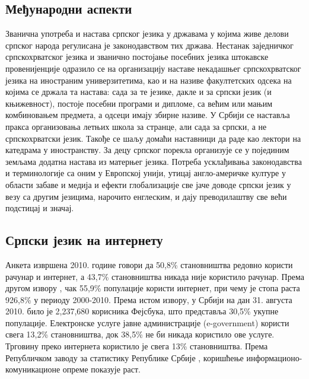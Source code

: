 {\begin{multicols}{2}
 \subsection {Међународни аспекти}
   
 
Званична употреба и настава српског језика у државама у којима живе делови српског народа регулисана је законодавством тих држава. 
Нестанак заједничког српскохрватског језика и званично постојање посебних језика штокавске провенијенције одразило се на организацију наставе некадашњег српскохрватског језика на иностраним универзитетима, као и на називе факултетских одсека на којима се држала та настава: сада за те језике, дакле и за српски језик (и књижевност), постоје посебни програми и дипломе, са већим или мањим комбиновањем предмета, а одсеци имају збирне називе.
У Србији се наставља пракса организовања летњих  школа за странце, али сада за српски, а не српскохрватски језик. Такође се шаљу домаћи наставници да раде као лектори на катедрама у иностранству. 
За децу српског порекла организује се у појединим земљама додатна настава из матерњег језика. 
Потреба усклађивања законодавства и терминологије са оним у Европској унији, утицај англо-америчке културе у области забаве и медија и ефекти глобализације све јаче доводе српски језик у везу са другим језицима, нарочито енглеским, и дају преводилаштву све већи  подстицај и значај.

 \subsection {Српски језик на интернету}
   
Анкета \cite{PKEY204} извршена 2010. године говори да 50,8\% становништва редовно користи рачунар и интернет, а 43,7\% становништва никада није користило рачунар. Према другом извору \cite{EUROPA2}, чак 55,9\% популације користи интернет, при чему је стопа раста 926,8\% у периоду 2000-2010. Према истом извору, у Србији на дан 31. августа 2010. било је 2,237,680 корисника Фејсбука, што представља 30,5\% укупне популације. Електронске услуге јавне администрације (e-government) користи  свега 13,2\% становништва, док 38,5\% не би никада користило ове услуге. Трговину преко интернета користило је свега 13\% становништва. Према Републичком заводу за статистику Републике Србије \cite{WEBRZS}, коришћење информационо-комуникационе опреме показује раст.


\end{multicols}}
